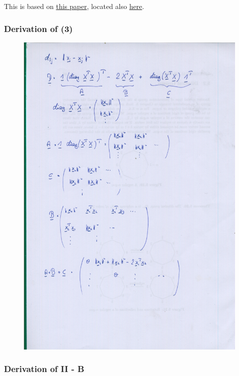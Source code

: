 

This is based on \href{http://arxiv.org/pdf/1502.07541.pdf}{this paper},
located also \href{\%7Bfilename\%7D/files/1502.07541.pdf}{here}.

\subsubsection{Derivation of (3)}\label{derivation-of-3}

\begin{figure}[H]
\centering
\includegraphics[scale=0.5]{images/edm_0001.png}
\end{figure}

\subsubsection{Derivation of II - B}\label{derivation-of-ii---b}

